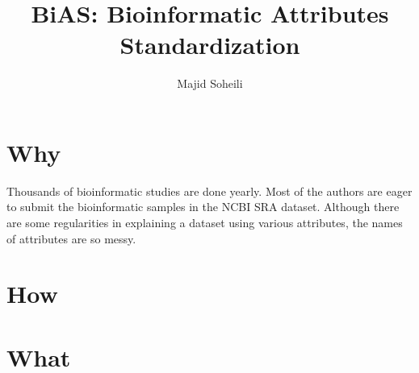\documentclass[a4paper]{article}
\begin{document}
    \title{BiAS: Bioinformatic Attributes Standardization}
    \author{Majid Soheili}
    \maketitle

    \section{Why}\label{sec:why}
    Thousands of bioinformatic studies are done yearly.
    Most of the authors are eager to submit the bioinformatic samples in the NCBI SRA dataset.
    Although there are some regularities in explaining a dataset using various attributes, the names of attributes are so messy.

    \section{How}\label{sec:how}
    \section{What}\label{sec:what}

    
    
\end{document}
